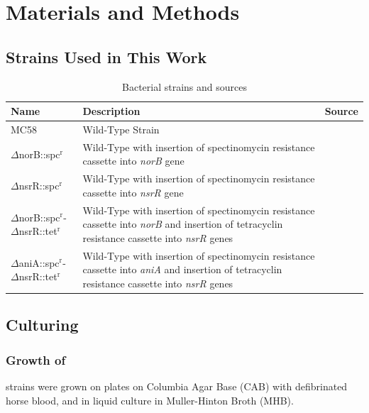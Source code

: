 \chapter{Materials and Methods}
\section{\Nsm{} Strains Used in This Work}
\begin{table}[h]
\begin{center}
\begin{tabular}{>{\centering}m{4.4cm}m{6.4cm}>{\centering}m{3.1cm}}
\toprule
\textbf{Name} & \centering \textbf{Description} & \textbf{Source}
\tabularnewline
\midrule
MC58 & Wild-Type Strain & \citet{McGuinness1990}
\tabularnewline\noalign{\smallskip}\hline\noalign{\smallskip}
$\Delta$norB::spc$^\textrm{r}$\nomenclature{spc$^\textrm{r}$}{Spectinomycin resistance} & Wild-Type with insertion of spectinomycin resistance cassette into \textit{norB} gene & \citet{Heurlier2008}
\tabularnewline\noalign{\smallskip}\hline\noalign{\smallskip}
$\Delta$nsrR::spc$^\textrm{r}$ & Wild-Type with insertion of spectinomycin resistance cassette into \textit{nsrR} gene & \citet{Rock2007}
\tabularnewline\noalign{\smallskip}\hline\noalign{\smallskip}
$\Delta$norB::spc$^\textrm{r}$-$\Delta$nsrR::tet$^\textrm{r}$\nomenclature{tet$^\textrm{r}$}{Tetracyclin resistance} & Wild-Type with insertion of spectinomycin resistance cassette into \textit{norB} and insertion of tetracyclin resistance cassette into \textit{nsrR} genes & \citet{Heurlier2008}
\tabularnewline\noalign{\smallskip}\hline\noalign{\smallskip}
$\Delta$aniA::spc$^\textrm{r}$-$\Delta$nsrR::tet$^\textrm{r}$ & Wild-Type with insertion of spectinomycin resistance cassette into \textit{aniA} and insertion of tetracyclin resistance cassette into \textit{nsrR} genes & \citet{Heurlier2008}
\tabularnewline
\bottomrule
\end{tabular} 
\end{center}
\caption{Bacterial strains and sources
\label{tab:bacterial-strains}}
\end{table}

\section{Culturing \Nsm{}}
\subsection{Growth of \Nsm{}}
\Nm{} strains were grown on plates on Columbia Agar Base (CAB) with defibrinated horse blood, and in liquid culture in Muller-Hinton Broth (MHB).

